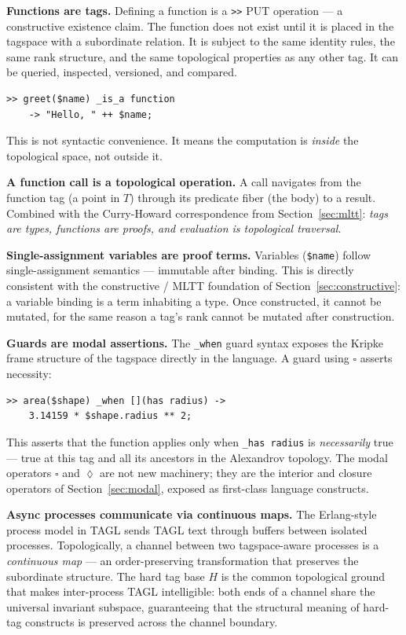 \documentclass{article}
\begin{document}
\textbf{Functions are tags.} Defining a function is a \texttt{>>} PUT
operation --- a constructive existence claim. The function does not exist
until it is placed in the tagspace with a subordinate relation. It is subject
to the same identity rules, the same rank structure, and the same topological
properties as any other tag. It can be queried, inspected, versioned, and
compared.

\begin{lstlisting}[style=tagl, caption={A function defined as a tag via PUT}]
>> greet($name) _is_a function
    -> "Hello, " ++ $name;
\end{lstlisting}

This is not syntactic convenience. It means the computation is \emph{inside}
the topological space, not outside it.

\textbf{A function call is a topological operation.} A call navigates from
the function tag (a point in $T$) through its predicate fiber (the body) to
a result. Combined with the Curry-Howard correspondence from
Section~\ref{sec:mltt}: \emph{tags are types, functions are proofs, and
evaluation is topological traversal}.

\textbf{Single-assignment variables are proof terms.} Variables (\texttt{\$name})
follow single-assignment semantics --- immutable after binding. This is
directly consistent with the constructive / MLTT foundation of
Section~\ref{sec:constructive}: a variable binding is a term inhabiting a
type. Once constructed, it cannot be mutated, for the same reason a tag's
rank cannot be mutated after construction.

\textbf{Guards are modal assertions.} The \texttt{\_when} guard syntax
exposes the Kripke frame structure of the tagspace directly in the language.
A guard using $\square$ asserts necessity:

\begin{lstlisting}[style=tagl, caption={Modal guard using the necessity operator}]
>> area($shape) _when [](has radius) ->
    3.14159 * $shape.radius ** 2;
\end{lstlisting}

This asserts that the function applies only when \texttt{\_has radius} is
\emph{necessarily} true --- true at this tag and all its ancestors in the
Alexandrov topology. The modal operators $\square$ and $\lozenge$ are not
new machinery; they are the interior and closure operators of
Section~\ref{sec:modal}, exposed as first-class language constructs.

\textbf{Async processes communicate via continuous maps.} The Erlang-style
process model in TAGL sends TAGL text through buffers between isolated
processes. Topologically, a channel between two tagspace-aware processes is
a \emph{continuous map} --- an order-preserving transformation that preserves
the subordinate structure. The hard tag base $H$ is the common topological
ground that makes inter-process TAGL intelligible: both ends of a channel
share the universal invariant subspace, guaranteeing that the structural
meaning of hard-tag constructs is preserved across the channel boundary.
\end{document}

